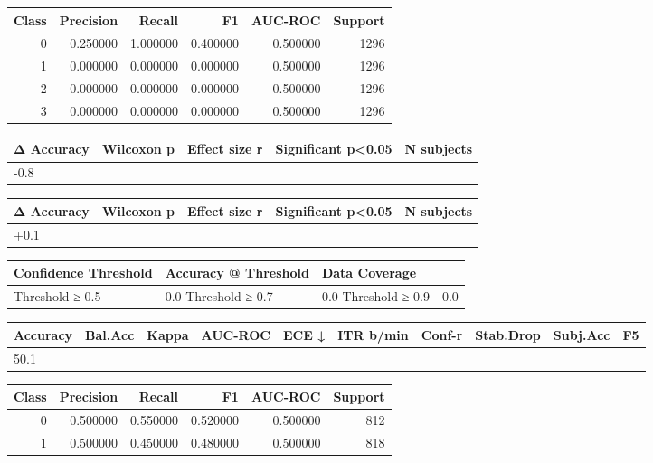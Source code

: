 \begin{tabular}{rrrrrr}
\toprule
Class & Precision & Recall & F1 & AUC-ROC & Support \\
\midrule
0 & 0.250000 & 1.000000 & 0.400000 & 0.500000 & 1296 \\
1 & 0.000000 & 0.000000 & 0.000000 & 0.500000 & 1296 \\
2 & 0.000000 & 0.000000 & 0.000000 & 0.500000 & 1296 \\
3 & 0.000000 & 0.000000 & 0.000000 & 0.500000 & 1296 \\
\bottomrule
\end{tabular}


\begin{tabular}{lrrll}
\toprule
Δ Accuracy & Wilcoxon p & Effect size r & Significant p<0.05 & N subjects \\
\midrule
-0.8%
\bottomrule
\end{tabular}


\begin{tabular}{lrrll}
\toprule
Δ Accuracy & Wilcoxon p & Effect size r & Significant p<0.05 & N subjects \\
\midrule
+0.1%
\bottomrule
\end{tabular}


\begin{tabular}{lll}
\toprule
Confidence Threshold & Accuracy @ Threshold & Data Coverage \\
\midrule
Threshold ≥ 0.5 & 0.0%
Threshold ≥ 0.7 & 0.0%
Threshold ≥ 0.9 & 0.0%
\bottomrule
\end{tabular}


\begin{tabular}{llrrrrrlll}
\toprule
Accuracy & Bal.Acc & Kappa & AUC-ROC & ECE ↓ & ITR b/min & Conf-r & Stab.Drop & Subj.Acc & F5 \\
\midrule
50.1%
\bottomrule
\end{tabular}


\begin{tabular}{rrrrrr}
\toprule
Class & Precision & Recall & F1 & AUC-ROC & Support \\
\midrule
0 & 0.500000 & 0.550000 & 0.520000 & 0.500000 & 812 \\
1 & 0.500000 & 0.450000 & 0.480000 & 0.500000 & 818 \\
\bottomrule
\end{tabular}


